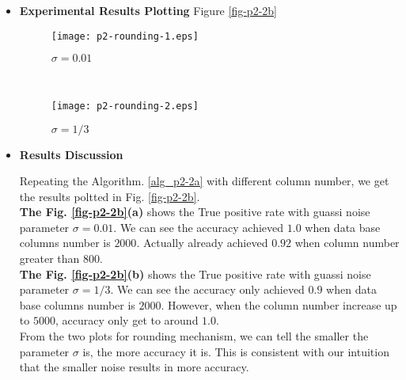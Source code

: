 \documentclass[11pt]{article}
\begin{document}
\begin{enumerate}
\begin{enumerate}
\begin{itemize}
\begin{algorithm}
\begin{algorithmic}
		\STATE	{}
		
		\ 
		$c = $ Counting how many items in $score_{in}$ greater than all items in $score_{out}$.
		
		\  $p = c / n$

		\RETURN True positive $p$
		\end{algorithmic}
		\end{algorithm}

%

		\item \textbf{Experimental Results Plotting}
		Figure \ref{fig-p2-2b}

		\begin{figure*}[t!]
		    \centering
		    \begin{subfigure}[t]{0.5\textwidth}
		        \centering
		        \texttt{[image: p2-rounding-1.eps]}
		        \caption{$\sigma = 0.01$}
		    \end{subfigure}%
		    ~ 
		    \begin{subfigure}[t]{0.5\textwidth}
		        \centering
		        \texttt{[image: p2-rounding-2.eps]}
		        \caption{$\sigma = 1/3$}
		    \end{subfigure}
		    \caption{P2 : rounding mechanism}
		    \label{fig-p2-2b}
		\end{figure*}
		\item \textbf{Results Discussion}

		Repeating the Algorithm. \ref{alg_p2-2a} with different column number, we get the results poltted in Fig. \ref{fig-p2-2b}. 
		\\
		{\bf The Fig. \ref{fig-p2-2b}(a)} shows the True positive rate with guassi noise parameter $\sigma = 0.01$. We can see the accuracy achieved $1.0$ when data base columns number is $2000$. Actually already achieved $0.92$ when column number greater than $800$.
		\\
		{\bf The Fig. \ref{fig-p2-2b}(b)} shows the True positive rate with guassi noise parameter $\sigma = 1/3$. We can see the accuracy only achieved $0.9$ when data base columns number is $2000$. However, when the column number increase up to $5000$, accuracy only get to around $1.0$.
		\\
		From the two plots for rounding mechanism, we can tell the smaller the parameter $\sigma$ is, the more accuracy it is. This is consistent with our intuition that the smaller noise results in more accuracy.


\end{itemize}
\end{enumerate}
\end{enumerate}
\end{document}
